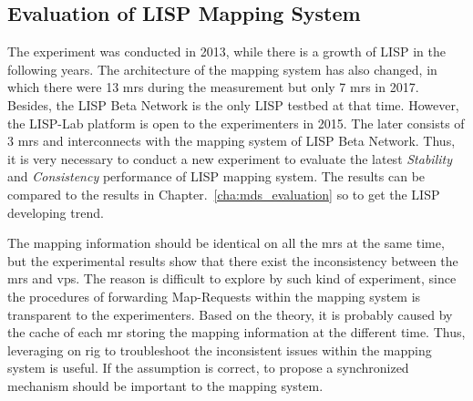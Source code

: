 \subsection{Evaluation of LISP Mapping System}
The experiment was conducted in 2013, while there is a growth of LISP in the following years. The architecture of the mapping system has also changed, in which there were 13 \acrshort{mr}s during the measurement but only 7 \acrshort{mr}s in 2017. Besides, the LISP Beta Network is the only LISP testbed at that time. However, the LISP-Lab platform is open to the experimenters in 2015. The later consists of 3 \acrshort{mr}s and interconnects with the mapping system of LISP Beta Network. Thus, it is very necessary to conduct a new experiment to evaluate the latest \emph{Stability} and \emph{Consistency} performance of LISP mapping system. The results can be compared to the results in Chapter.~\ref{cha:mds_evaluation} so to get the LISP developing trend. 

The mapping information should be identical on all the \acrshort{mr}s at the same time, but the experimental results show that there exist the inconsistency between the \acrshort{mr}s and \acrshort{vp}s. The reason is difficult to explore by such kind of experiment, since the procedures of forwarding Map-Requests within the mapping system is transparent to the experimenters. Based on the theory, it is probably caused by the cache of each \acrshort{mr} storing the mapping information at the different time. Thus, leveraging on \acrfull{rig} to troubleshoot the inconsistent issues within the mapping system is useful. If the assumption is correct, to propose a synchronized mechanism should be important to the mapping system.

